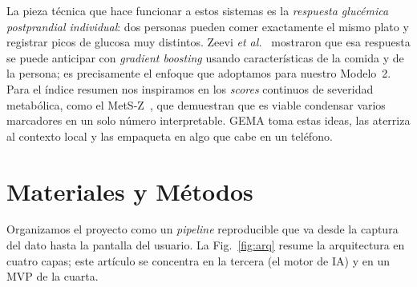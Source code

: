 \documentclass[9pt,letterpaper,twocolumn]{extarticle}
\begin{document}
La pieza técnica que hace funcionar a estos sistemas es la \emph{respuesta
glucémica postprandial individual}: dos personas pueden comer exactamente el
mismo plato y registrar picos de glucosa muy distintos. Zeevi
\textit{et al.}~\cite{zeevi} mostraron que esa respuesta se puede anticipar con
\emph{gradient boosting} usando características de la comida y de la persona; es
precisamente el enfoque que adoptamos para nuestro Modelo~2. Para el índice
resumen nos inspiramos en los \emph{scores} continuos de severidad metabólica,
como el MetS-Z~\cite{gurka}, que demuestran que es viable condensar varios
marcadores en un solo número interpretable. GEMA toma estas ideas, las aterriza
al contexto local y las empaqueta en algo que cabe en un teléfono.

\section{Materiales y Métodos}\label{sec:met}
Organizamos el proyecto como un \emph{pipeline} reproducible que va desde la
captura del dato hasta la pantalla del usuario. La Fig.~\ref{fig:arq} resume la
arquitectura en cuatro capas; este artículo se concentra en la tercera (el motor
de IA) y en un MVP de la cuarta.
\end{document}
